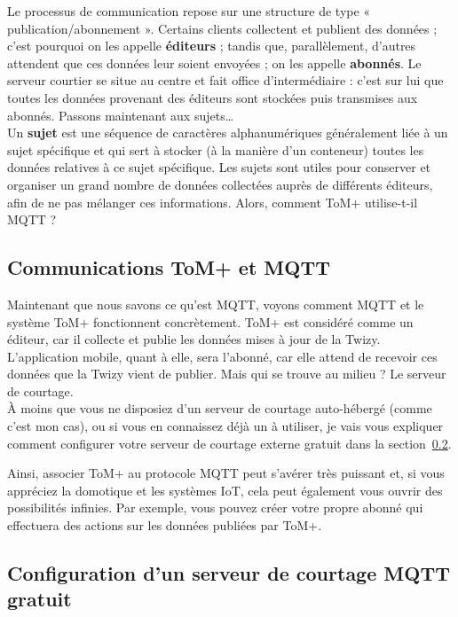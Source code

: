 Le processus de communication repose sur une structure de type « publication/abonnement ». Certains clients
collectent et publient des données ; c’est pourquoi on les appelle \textbf{éditeurs} ; tandis que,
parallèlement, d’autres attendent que ces données leur soient envoyées ; on les appelle \textbf{abonnés}.
Le serveur courtier se situe au centre et fait office d’intermédiaire : c’est sur lui que toutes les données
provenant des éditeurs sont stockées puis transmises aux abonnés. Passons maintenant aux sujets…\\


Un \textbf{sujet} est une séquence de caractères alphanumériques généralement liée à un
sujet spécifique et qui sert à stocker (à la manière d’un conteneur) toutes les données relatives à ce
sujet spécifique. Les sujets sont utiles pour conserver et organiser un grand nombre de données collectées auprès de différents
éditeurs, afin de ne pas mélanger ces informations. Alors, comment ToM+ utilise-t-il MQTT ?

\subsection{Communications ToM+ et MQTT}

Maintenant que nous savons ce qu’est MQTT, voyons comment MQTT et le système ToM+ fonctionnent concrètement.
ToM+ est considéré comme un éditeur, car il collecte et publie les données mises à jour de la Twizy.
L’application mobile, quant à elle, sera l’abonné, car elle attend de recevoir
ces données que la Twizy vient de publier. Mais qui se trouve au milieu ? Le serveur de courtage.\\

À moins que vous ne disposiez d’un serveur de courtage auto-hébergé (comme c’est mon cas), ou si vous en connaissez déjà un à utiliser, je
vais vous expliquer comment configurer votre serveur de courtage externe gratuit dans la section~\ref{sec:free_broker}.


Ainsi, associer ToM+ au protocole MQTT peut s’avérer très puissant et, si vous appréciez la
domotique et les systèmes IoT, cela peut également vous ouvrir des possibilités infinies. Par exemple, vous pouvez
créer votre propre abonné qui effectuera des actions sur les données publiées par ToM+.\\

\subsection{Configuration d’un serveur de courtage MQTT gratuit}
\label{sec:free_broker}


